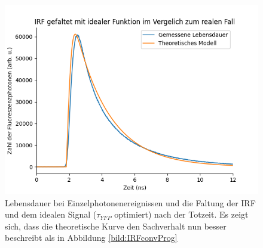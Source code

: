 \begin{figure}[h]
    \centering
    \includegraphics[width = \linewidth]{Bilder/Auswertung/IRFGaussianConvolCorrectet.png}
    \caption{Lebensdauer bei Einzelphotonenereignissen und die Faltung der IRF und dem idealen Signal ($\tau_{YFP}$ optimiert) nach der Totzeit. Es zeigt sich, dass die theoretische Kurve 
    den Sachverhalt nun besser beschreibt als in Abbildung \ref{bild:IRFconvProg}}
    \label{bild:IRFconvProOpt}
\end{figure}


